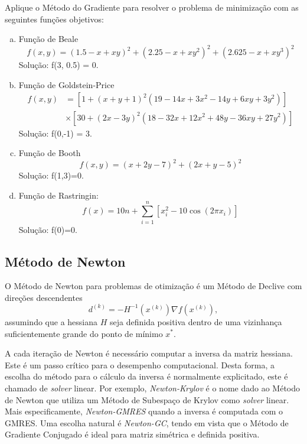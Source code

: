 \begin{exer}\label{exer:optFuns}
  Aplique o Método do Gradiente para resolver o problema de minimização com as seguintes funções objetivos:
  \begin{enumerate}[a)]
  \item Função de Beale
    \begin{equation}
      f(x,y) = (1.5-x+xy)^2 + (2.25-x+xy^2)^2 + (2.625-x+xy^3)^2
    \end{equation}
    Solução: f(3, 0.5) = 0.
  \item Função de Goldstein-Price
    \begin{align}
      f(x,y) &= \left[1+\left(x+y+1\right)^{2}\left(19-14x+3x^{2}-14y+6xy+3y^{2}\right)\right]\nonumber\\
      &\times \left[30+\left(2x-3y\right)^{2}\left(18-32x+12x^{2}+48y-36xy+27y^{2}\right)\right]
    \end{align}
    Solução: f(0,-1) = 3.
  \item Função de Booth
    \begin{equation}
      f(x,y) = \left( x + 2y -7\right)^{2} + \left(2x +y - 5\right)^{2}
    \end{equation}
    Solução: f(1,3)=0.
  \item Função de Rastringin:
    \begin{equation}
      f(x) = 10 n + \sum_{i=1}^n \left[x_i^2 - 10\cos(2 \pi x_i)\right]
    \end{equation}
    Solução: f(0)=0.
  \end{enumerate}
\end{exer}


\subsection{Método de Newton}

O Método de Newton{\newton} para problemas de otimização é um Método de Declive com direções descendentes
\begin{equation}
  d^{(k)} = -H^{-1}(x^{(k)})\nabla f(x^{(k)}),
\end{equation}
assumindo que a hessiana $H$ seja definida positiva dentro de uma vizinhança suficientemente grande do ponto de mínimo $x^*$.

\begin{obs}
  A cada iteração de Newton é necessário computar a inversa da matriz hessiana. Este é um passo crítico para o desempenho computacional. Desta forma, a escolha do método para o cálculo da inversa é normalmente explicitado, este é chamado de {\it solver} linear. Por exemplo, \emph{Newton-Krylov} é o nome dado ao Método de Newton que utiliza um Método de Subespaço de Krylov como {\it solver} linear. Mais especificamente, \emph{Newton-GMRES} quando a inversa é computada com o GMRES. Uma escolha natural é \emph{Newton-GC}, tendo em vista que o Método de Gradiente Conjugado é ideal para matriz simétrica e definida positiva.
\end{obs}

